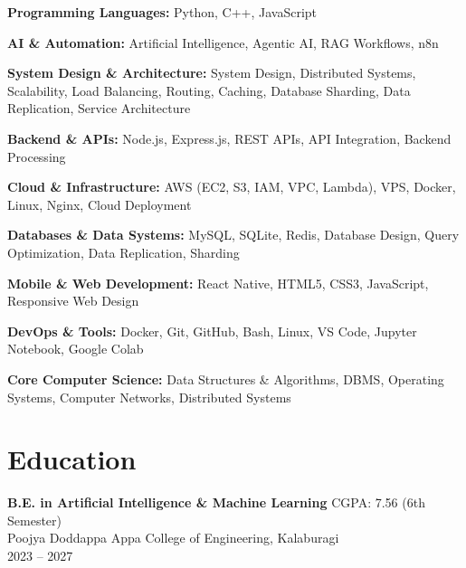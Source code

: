 \documentclass[10pt]{article}
\begin{document}
\textbf{Programming Languages:} Python, C++, JavaScript \\
\vspace{3pt}

\textbf{AI \& Automation:} Artificial Intelligence, Agentic AI, RAG Workflows, n8n \\
\vspace{3pt}

\textbf{System Design \& Architecture:} System Design, Distributed Systems, Scalability, Load Balancing, Routing, Caching, Database Sharding, Data Replication, Service Architecture \\
\vspace{3pt}

\textbf{Backend \& APIs:} Node.js, Express.js, REST APIs, API Integration, Backend Processing \\
\vspace{3pt}

\textbf{Cloud \& Infrastructure:} AWS (EC2, S3, IAM, VPC, Lambda), VPS, Docker, Linux, Nginx, Cloud Deployment \\
\vspace{3pt}

\textbf{Databases \& Data Systems:} MySQL, SQLite, Redis, Database Design, Query Optimization, Data Replication, Sharding \\
\vspace{3pt}

\textbf{Mobile \& Web Development:} React Native, HTML5, CSS3, JavaScript, Responsive Web Design \\
\vspace{3pt}

\textbf{DevOps \& Tools:} Docker, Git, GitHub, Bash, Linux, VS Code, Jupyter Notebook, Google Colab \\
\vspace{3pt}

\textbf{Core Computer Science:} Data Structures \& Algorithms, DBMS, Operating Systems, Computer Networks, Distributed Systems



\section{Education}

\textbf{B.E. in Artificial Intelligence \& Machine Learning} \hfill CGPA: 7.56 (6th Semester) \\
Poojya Doddappa Appa College of Engineering, Kalaburagi \\
2023 -- 2027
\end{document}
